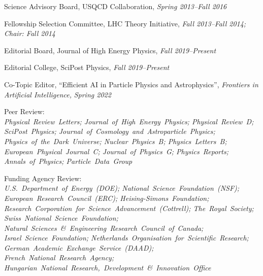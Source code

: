 \item Science Advisory Board, USQCD Collaboration, \emph{Spring 2013--Fall 2016}
\item Fellowship Selection Committee, LHC Theory Initiative, \emph{Fall 2013--Fall 2014; Chair: Fall 2014}
\item Editorial Board, Journal of High Energy Physics, \emph{Fall 2019--Present}
\item Editorial College, SciPost Physics, \emph{Fall 2019--Present}
\item Co-Topic Editor, ``Efficient AI in Particle Physics and Astrophysics'', \emph{Frontiers in Artificial Intelligence, }\emph{Spring 2022}
\item \raggedright Peer Review: \\ \textit{\nohyphens{Physical~Review~Letters; Journal~of~High~Energy~Physics; Physical~Review~D; SciPost~Physics; Journal~of~Cosmology~and~Astroparticle~Physics; Physics~of~the~Dark~Universe; Nuclear~Physics~B; Physics~Letters~B; European~Physical~Journal~C; Journal~of~Physics~G; Physics~Reports; Annals~of~Physics; Particle~Data~Group}}
\item \raggedright Funding Agency Review: \\ \textit{\nohyphens{U.S.~Department~of~Energy~(DOE); National~Science~Foundation~(NSF); European~Research~Council~(ERC); Heising-Simons~Foundation; Research~Corporation~for~Science~Advancement~(Cottrell); The~Royal~Society; Swiss~National~Science~Foundation; Natural~Sciences~\&~Engineering~Research~Council~of~Canada; Israel~Science~Foundation; Netherlands~Organisation~for~Scientific~Research; German~Academic~Exchange~Service~(DAAD); French~National~Research~Agency; Hungarian~National~Research,~Development~\&~Innovation~Office}}
